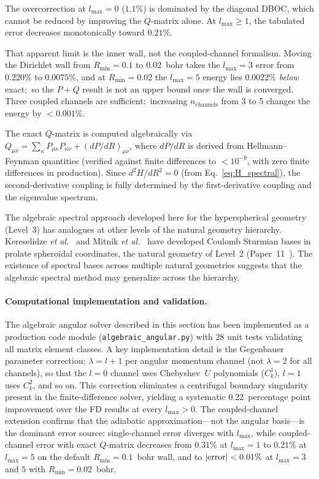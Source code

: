 \documentclass[aps,pra,twocolumn,superscriptaddress,longbibliography]{revtex4-2}
\begin{document}
The overcorrection at $l_{\max} = 0$ ($1.1\%$) is dominated by the
diagonal DBOC, which cannot be reduced by improving the $Q$-matrix
alone.  At $l_{\max} \ge 1$, the tabulated error decreases
monotonically toward $0.21\%$.

That apparent limit is the inner wall, not the coupled-channel
formalism.  Moving the Dirichlet wall from $R_{\min} = 0.1$ to
$0.02$~bohr takes the $l_{\max} = 3$ error from $0.220\%$ to
$0.0075\%$, and at $R_{\min} = 0.02$ the $l_{\max} = 5$ energy lies
$0.0022\%$ \emph{below} exact;\ so the $P{+}Q$ result is not an
upper bound once the wall is converged.  Three coupled channels are
sufficient:\ increasing $n_{\mathrm{channels}}$ from 3 to 5 changes
the energy by $< 0.001\%$.

The exact $Q$-matrix is computed algebraically via
$Q_{\mu\nu} = \sum_\kappa P_{\mu\kappa}P_{\kappa\nu}
+ (dP/dR)_{\mu\nu}$, where $dP/dR$ is derived from
Hellmann--Feynman quantities (verified against finite differences
to $< 10^{-9}$, with zero finite differences in production).
Since $d^2H/dR^2 = 0$ (from Eq.~\ref{eq:H_spectral}), the
second-derivative coupling is fully determined by the
first-derivative coupling and the eigenvalue spectrum.

The algebraic spectral approach developed here for the hyperspherical
geometry (Level~3) has analogues at other levels of the natural
geometry hierarchy.  Kereselidze \textit{et al.}~\cite{Kereselidze2016}
and Mitnik \textit{et al.}~\cite{Mitnik2021} have developed Coulomb
Sturmian bases in prolate spheroidal coordinates, the natural geometry
of Level~2 (Paper~11~\cite{loutey_paper11}).  The existence of
spectral bases across multiple natural geometries suggests that the
algebraic spectral method may generalize across the hierarchy.

\paragraph{Computational implementation and validation.}
The algebraic angular solver described in this section has been
implemented as a production code module (\texttt{algebraic\_angular.py})
with 28 unit tests validating all matrix element classes.  A key
implementation detail is the Gegenbauer parameter correction:
$\lambda = l + 1$ per angular momentum channel (not $\lambda = 2$
for all channels), so that the $l = 0$ channel uses Chebyshev~$U$
polynomials ($C_k^1$), $l = 1$ uses $C_k^2$, and so on.  This
correction eliminates a centrifugal boundary singularity present in
the finite-difference solver, yielding a systematic 0.22~percentage
point improvement over the FD results at every $l_{\max} > 0$.
The coupled-channel extension confirms that the adiabatic
approximation---not the angular basis---is the dominant error source:
single-channel error diverges with $l_{\max}$, while coupled-channel
error with exact $Q$-matrix decreases from $0.31\%$ at
$l_{\max} = 1$ to $0.21\%$ at $l_{\max} = 5$ on the default
$R_{\min} = 0.1$~bohr wall, and to $|{\rm error}| < 0.01\%$ at
$l_{\max} = 3$ and $5$ with $R_{\min} = 0.02$~bohr.
\end{document}

